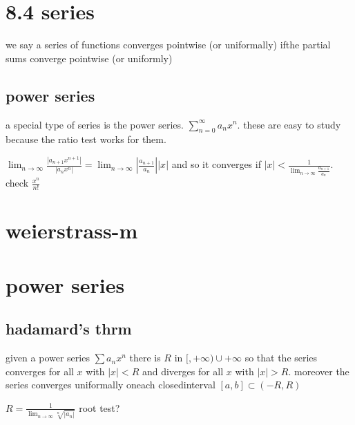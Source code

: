 \documentclass[letterpaper]{article}
\begin{document}
\section*{8.4 series}
we say a series of functions converges pointwise (or uniformally) ifthe partial sums converge pointwise (or uniformly)

\subsection*{power series}
a special type of series is the power series. $\sum\limits_{n=0}^\infty{a_nx^n}$. these are easy to study because the ratio test works for them.

$\lim_{n\to\infty}\frac{|a_{n+1}x^{n+1}|}{|a_nx^n|}=\lim_{n\to\infty}\left\lvert\frac{a_{n+1}}{a_n}\right\rvert|x|$ and so it converges if $|x|<\frac{1}{\lim_{n\to \infty}\frac{a_{n+1}}{a_n}}$. check $\frac{x^n}{n!}$

\section*{weierstrass-m}

\section*{power series}
\subsection*{hadamard's thrm}
given a power series $\sum{a_nx^n}$ there is $R$ in $[,+\infty)\cup{+\infty}$ so that the series converges for all $x$ with $|x|<R$ and diverges for all $x$ with $|x|>R$. moreover the series converges uniformally oneach closedinterval $[a,b]\subset(-R,R)$

$R=\frac{1}{\lim_{n\to\infty}\sqrt[n]{|a_n|}}$ root test?
\end{document}
